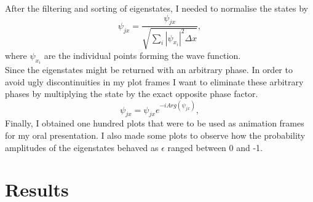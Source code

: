\documentclass[10pt, a4paper, singlespacing]{report}
\begin{document}
After the filtering and sorting of eigenstates, I needed to normalise the states by 
\begin{equation}
\psi_{jx} = \frac{\psi_{jx}}{\sqrt{\sum_{i} |\psi_{x_{i}}|^2 \Delta x}},
\end{equation}
where $\psi_{x_{i}}$ are the individual points forming the wave function.\\
Since the eigenstates might be returned with an arbitrary phase. In order to avoid ugly discontinuities in my plot frames I want to eliminate these arbitrary phases by multiplying the state by the exact opposite phase factor.
\begin{equation}
\psi_{jx} = \psi_{jx} e^{-iArg(\psi_{jx})},
\end{equation}
Finally, I obtained one hundred plots that were to be used as animation frames for my oral presentation. I also made some plots to observe how the probability amplitudes of the eigenstates behaved as $\epsilon$ ranged between 0 and -1.
\vspace*{5cm}

\section{Results}
\end{document}
